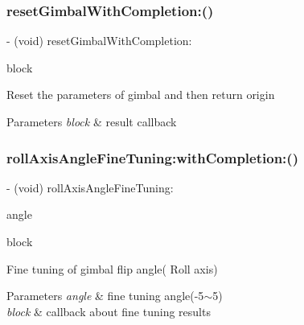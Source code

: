 \subsubsection{\texorpdfstring{reset\+Gimbal\+With\+Completion\+:()}{resetGimbalWithCompletion:()}}
{\footnotesize\ttfamily -\/ (void) reset\+Gimbal\+With\+Completion\+: \begin{DoxyParamCaption}\item[{(P\+V\+Completion\+Block)}]{block }\end{DoxyParamCaption}}

Reset the parameters of gimbal and then return origin


\begin{DoxyParams}{Parameters}
{\em block} & result callback \\
\hline
\end{DoxyParams}
\mbox{\label{interface_p_v_gimabal_af41d05f3ab40b6d7cd6bf8c1cd899da8}} 
\subsubsection{\texorpdfstring{roll\+Axis\+Angle\+Fine\+Tuning\+:with\+Completion\+:()}{rollAxisAngleFineTuning:withCompletion:()}}
{\footnotesize\ttfamily -\/ (void) roll\+Axis\+Angle\+Fine\+Tuning\+: \begin{DoxyParamCaption}\item[{(float)}]{angle }\item[{withCompletion:(P\+V\+Completion\+Block)}]{block }\end{DoxyParamCaption}}

Fine tuning of gimbal flip angle( Roll axis)


\begin{DoxyParams}{Parameters}
{\em angle} & fine tuning angle(-\/5$\sim$5) \\
\hline
{\em block} & callback about fine tuning results \\
\hline
\end{DoxyParams}
\mbox{\label{interface_p_v_gimabal_ababb62efa51b69c4a043ae61438a1f34}} 

